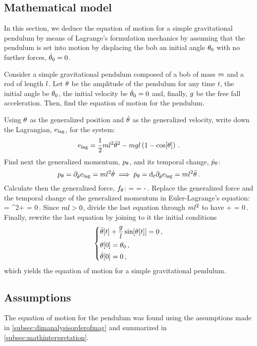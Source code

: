 \subsection{Mathematical model}\label{subsec:mathmodel}
In this section, we deduce the equation of motion for a simple gravitational pendulum by means of Lagrange's formulation mechanics by assuming that the pendulum is set into motion by displacing the bob an initial angle $\theta_0$ with no further forces, $\dot{\theta}_0 = 0$.

Consider a simple gravitational pendulum composed of a bob of mass $m$ and a rod of length $l$. Let $\theta$ be the amplitude of the pendulum for any time $t$, the initial angle be $\theta_0$, the initial velocity be $\dot{\theta}_0 = 0$ and, finally, $g$ be the free fall acceleration. Then, find the equation of motion for the pendulum.

Using $\theta$ as the generalized position and $\dot{\theta}$ as the generalized velocity, write down the Lagrangian, $e_\text{lag}$, for the system:
\begin{equation}\label{eq:lagrangiansimplependulum}
e_\text{lag} = \dfrac{1}{2}ml^2\dot{\theta}^2 - mgl\left(1 - \cos\!\left[{\theta}\right]\right)\,.
\end{equation}
Find next the generalized momentum, ${p}_{\theta}$, and its temporal change, ${\dot{p}}_{\theta}$:
\begin{equation}\label{eq:genmomentumanditstempchange}
{p}_{\theta}   = \partial_{\dot{\theta}}{e_\text{lag}} = ml^2\dot{\theta}\implies
{\dot{p}}_{\theta} = \text{d}_{t}\partial_{\dot{\theta}}{e_\text{lag}} = ml^2\ddot{\theta}\,.
\end{equation}
Calculate then the generalized force, ${f}_{\theta}$:
\beq
\igforce\angpos = \ipd{\angpos}{\lag} = -\mass\grav\length\sin\vat\angpos\,.
\eeq
Replace the generalized force and the temporal change of the generalized momentum in Euler-Lagrange's equation:
\beq
\igforce\angpos = \dtigmom\angpos \implies
\mass\length^2\angacc + \mass\grav\length\sin\vat\angpos = 0\,.
\eeq
Since $ml > 0$, divide the last equation through $ml^2$ to have
\beq
\angacc + \dfrac{\grav}{\length}\sin\vat\angpos = 0\,.
\eeq
Finally, rewrite the last equation by joining to it the initial conditions
\begin{equation}\label{eq:mathmodelsimppend}
  \begin{dcases}
    \ddot{\theta}\!\left[{t}\right] + \dfrac{g}{l}\sin\!\left[{\theta\!\left[{t}\right]}\right] = 0\,,\\
    \theta\!\left[{0}\right] = \theta_0\,,\\
    \dot{\theta}\!\left[{0}\right] = 0\,,
  \end{dcases}
\end{equation}
which yields the equation of motion for a simple gravitational pendulum.


\subsection{Assumptions}\label{subsec:assumptions}
The equation of motion for the pendulum was found using the assumptions made in \cref{subsec:dimanalysisorderofmag} and summarized in \cref{subsec:mathinterpretation}.
